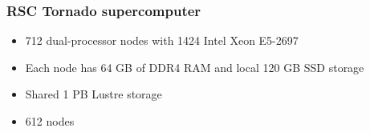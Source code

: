 
\begin{frame}
\frametitle{RSC Tornado supercomputer}
\begin{itemize}
\item 712 dual-processor nodes with 1424 Intel Xeon E5-2697
\item Each node has 64 GB of DDR4 RAM and local 120 GB SSD storage
\item Shared 1 PB Lustre storage
\item 612 nodes
\end{itemize}
\end{frame}
